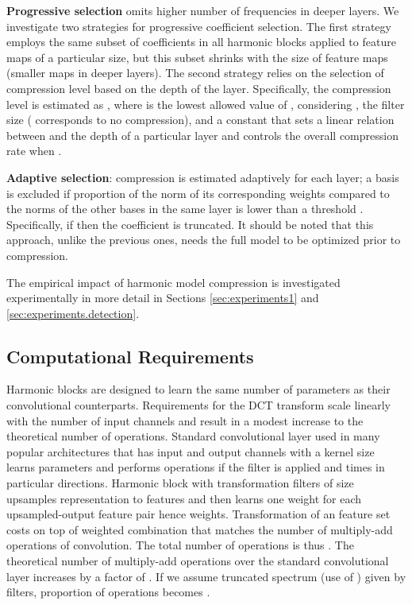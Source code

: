 \documentclass[12pt,a4paper]{article}
\begin{document}
\noindent\textbf{Progressive selection} omits higher number of frequencies in deeper layers. We investigate two strategies for progressive coefficient selection. The first strategy employs the same subset of coefficients in all harmonic blocks applied to feature maps of a particular size, but this subset shrinks with the size of feature maps (smaller maps in deeper layers). 
The second strategy relies on the selection of compression level based on the depth of the layer. Specifically, the compression level is estimated as , where  is the lowest allowed value of , considering ,  the filter size ( corresponds to no compression), and  a constant that sets a linear relation between  and the depth of a particular layer and controls the overall compression rate when .
    
\noindent\textbf{Adaptive selection}: compression is estimated adaptively for each layer; a basis is excluded if proportion of the  norm of its corresponding weights compared to the norms of the other bases in the same layer is lower than a threshold . Specifically, if  then the coefficient is truncated. It should be noted that this approach, unlike the previous ones, needs the full model to be optimized prior to compression.

The empirical impact of harmonic model compression is  investigated experimentally in more detail in Sections \ref{sec:experiments1} and \ref{sec:experiments.detection}.

\subsection{Computational Requirements} \label{sec:methodrequirements}

Harmonic blocks are designed to learn the same number of parameters as their convolutional counterparts. Requirements for the DCT transform scale linearly with the number of input channels and result in a modest increase to the theoretical number of operations. Standard convolutional layer used in many popular architectures that has  input and  output channels with a kernel size  learns  parameters and performs  operations if the filter is applied  and  times in particular directions. Harmonic block with  transformation filters of size  upsamples representation to  features and then learns one weight for each upsampled-output feature pair hence  weights. Transformation of an  feature set costs  on top of weighted combination  that matches the number of multiply-add operations of  convolution. The total number of operations is thus . The theoretical number of multiply-add operations over the standard convolutional layer increases by a factor of . If we assume truncated spectrum (use of ) given by  filters, proportion of operations becomes .
\end{document}
